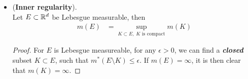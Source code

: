 \documentclass[11pt]{article}
\begin{document}
\begin{itemize}
\begin{proof}
Let $U= \bigcup_{k=1}^{\infty}U_{k}$ open and  $E\subset \bigcup_{k=1}^{\infty}A_{k}\subset U$. Consider $U \setminus E \supset \bigcup_{k=1}^{\infty}A_{k} \setminus  E$, as 
\begin{align*}
U \setminus E &= \paren{U \setminus \bigcup_{k=1}^{\infty}A_{k}}\cup \paren{\bigcup_{k=1}^{\infty}A_{k} \setminus  E}\\
&= \paren{\bigcup_{k=1}^{\infty}U_{k}\cap \bigcap_{k=1}^{\infty}A_{k}^{c}}\cup \paren{\bigcup_{k=1}^{\infty}(A_{k}\cap E^{c})}\\
&\subset    \bigcup_{k=1}^{\infty}\paren{U_{k}\cap A_{k}^{c}}\cup \paren{\bigcup_{k=1}^{\infty}(A_{k}\cap E^{c})}\\
m^{*}(U \setminus E) &\le \sum_{k=1}^{\infty}m^{*}(U_{k} \setminus A_{k}) + \sum_{k=1}^{\infty}m^{*}(A_{k}  \setminus  E)\\
&\le \epsilon/2\sum_{k=1}^{\infty}\frac{1}{2^{k}} + \sum_{k=1}^{\infty}m^{*}(A_{k}  \setminus  E)\\
&= \epsilon/2 + \sum_{k=1}^{\infty}m^{*}(A_{k}  \setminus  E)\\
&\le \epsilon/2 + \epsilon/2 = \epsilon
\end{align*}
The last inequality comes from 
\begin{align*}
\sum_{k=1}^{\infty}m^{*}(A_{k}  \setminus  E)&= \sum_{k=1}^{\infty}m(A_{k})  \setminus  \sum_{k=1}^{\infty}m^{*}(A_{k}\cap E) \quad \text{ (by additivity assumption)} \\
&\le m^{*}\paren{E} + \epsilon/2  \setminus   \sum_{k=1}^{\infty}m^{*}(A_{k}\cap E)\\
&\le m^{*}\paren{E} + \epsilon/2  \setminus  m^{*}(\bigcup_{k=1}^{\infty}A_{k}\cap E)\\
&= m^{*}\paren{E} + \epsilon/2  \setminus  m^{*}\paren{E} = \epsilon/2 \quad (\text{since }E\subset \bigcup_{k=1}^{\infty}A_{k})
\end{align*}

(3) $\Rightarrow$ (1)  Trivial, as the box $B$ is an elementary set. \qed
\end{proof}

\item \begin{proposition}(\textbf{Inner regularity}). \\
Let $E \subset {\mathbb R}^d$ be Lebesgue measurable, then
\begin{align*}
m(E)& = \sup\limits_{K\subset E, \; K \text{ is compact}}m(K)
\end{align*}
\end{proposition}
\begin{proof}
For $E$ is Lebesgue measureable, for any $\epsilon>0$, we can find a \textbf{\emph{closed}} subset $K\subset E$, such that $m^{*}(E \setminus  K)\le \epsilon$. If $m(E)=\infty$, it is then clear that $m(K)=\infty$. 


\end{proof}
\end{itemize}
\end{document}
